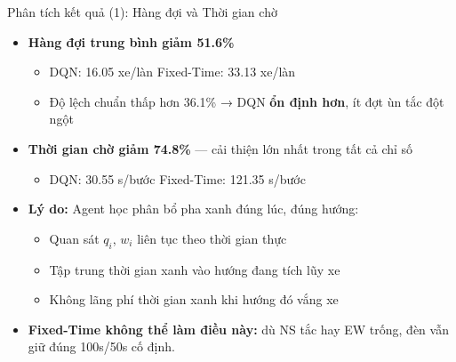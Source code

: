 \begin{frame}{Phân tích kết quả (1): Hàng đợi và Thời gian chờ}
\begin{itemize}
    \item \textbf{Hàng đợi trung bình giảm 51.6\%}
    \begin{itemize}
        \item DQN: 16.05 xe/làn \quad Fixed-Time: 33.13 xe/làn
        \item Độ lệch chuẩn thấp hơn 36.1\% → DQN \textbf{ổn định hơn}, ít đợt ùn tắc đột ngột
    \end{itemize}
    \item \textbf{Thời gian chờ giảm 74.8\%} — cải thiện lớn nhất trong tất cả chỉ số
    \begin{itemize}
        \item DQN: 30.55 s/bước \quad Fixed-Time: 121.35 s/bước
    \end{itemize}
    \item \textbf{Lý do:} Agent học phân bổ pha xanh đúng lúc, đúng hướng:
    \begin{itemize}
        \item Quan sát $q_i$, $w_i$ liên tục theo thời gian thực
        \item Tập trung thời gian xanh vào hướng đang tích lũy xe
        \item Không lãng phí thời gian xanh khi hướng đó vắng xe
    \end{itemize}
    \item \textbf{Fixed-Time không thể làm điều này:} dù NS tắc hay EW trống, đèn vẫn giữ đúng 100s/50s cố định.
\end{itemize}
\end{frame}


